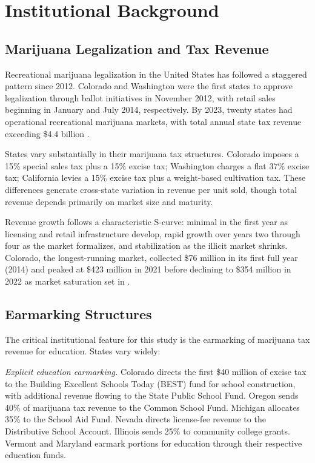 \documentclass[12pt]{article}
\begin{document}
\section{Institutional Background}

\subsection{Marijuana Legalization and Tax Revenue}

Recreational marijuana legalization in the United States has followed a staggered pattern since 2012. Colorado and Washington were the first states to approve legalization through ballot initiatives in November 2012, with retail sales beginning in January and July 2014, respectively. By 2023, twenty states had operational recreational marijuana markets, with total annual state tax revenue exceeding \$4.4 billion \citep{taxfoundation2024cannabis}.

States vary substantially in their marijuana tax structures. Colorado imposes a 15\% special sales tax plus a 15\% excise tax; Washington charges a flat 37\% excise tax; California levies a 15\% excise tax plus a weight-based cultivation tax. These differences generate cross-state variation in revenue per unit sold, though total revenue depends primarily on market size and maturity.

Revenue growth follows a characteristic S-curve: minimal in the first year as licensing and retail infrastructure develop, rapid growth over years two through four as the market formalizes, and stabilization as the illicit market shrinks. Colorado, the longest-running market, collected \$76 million in its first full year (2014) and peaked at \$423 million in 2021 before declining to \$354 million in 2022 as market saturation set in \citep{colo_dor2023}.

\subsection{Earmarking Structures}

The critical institutional feature for this study is the earmarking of marijuana tax revenue for education. States vary widely:

\textit{Explicit education earmarking.} Colorado directs the first \$40 million of excise tax to the Building Excellent Schools Today (BEST) fund for school construction, with additional revenue flowing to the State Public School Fund. Oregon sends 40\% of marijuana tax revenue to the Common School Fund. Michigan allocates 35\% to the School Aid Fund. Nevada directs license-fee revenue to the Distributive School Account. Illinois sends 25\% to community college grants. Vermont and Maryland earmark portions for education through their respective education funds.
\end{document}
